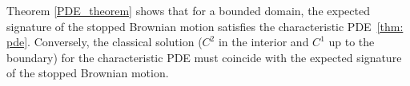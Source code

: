 \documentclass[11pt,a4paper,english,reqno]{amsart}
\theoremstyle{plain}
\newtheorem{lemma}[definition]{Lemma}
\newcommand{\R}{\mathbb{R}}
\newcommand{\p}{\partial}
\newcommand{\1}{\mathbbm{1}}
\newcommand{\B}{\mathbf{B}}
\begin{document}




Theorem \ref{PDE_theorem} shows that for a bounded domain, the expected signature of the stopped Brownian motion satisfies the characteristic PDE~\eqref{thm: pde}. Conversely, the classical solution ($C^2$ in the interior and $C^1$ up to the boundary) for the characteristic PDE must coincide with the expected signature of the stopped Brownian motion. %



\end{document}
